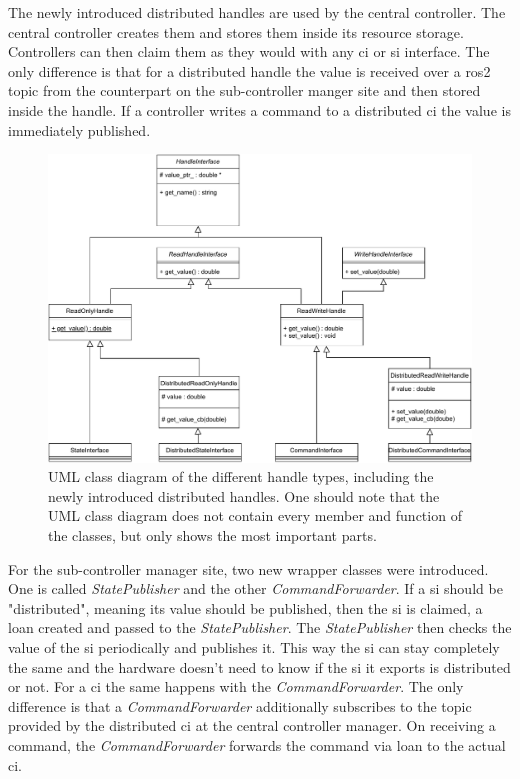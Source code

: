 The newly introduced distributed \glspl{handle} are used by the central controller. The central controller creates them and stores them inside its resource storage. Controllers can then claim them as they would with any \gls{ci} or \gls{si} interface. The only difference is that for a distributed \gls{handle} the value is received over a \gls{ros2} topic from the counterpart on the sub-controller manger site and then stored inside the \gls{handle}. If a controller writes a command to a distributed \gls{ci} the value is immediately published. \newline
\begin{figure}[htbp]
	\centering
	\includegraphics[width=1\textwidth]{Figures/c5/Handles_UML.pdf}
	\caption{UML class diagram of the different \gls{handle} types, including the newly introduced distributed \glspl{handle}. One should note that the UML class diagram does not contain every member and function of the classes, but only shows the most important parts. }
	\label{c5_fig_handle_uml}
\end{figure}
For the sub-controller manager site, two new wrapper classes were introduced. One is called \textit{StatePublisher} and the other \textit{CommandForwarder}. If a \gls{si} should be "distributed", meaning its value should be published, then the \gls{si} is claimed, a loan created and passed to the \textit{StatePublisher}. The \textit{StatePublisher} then checks the value of the \gls{si} periodically and publishes it. This way the \gls{si} can stay completely the same and the hardware doesn't need to know if the \gls{si} it exports is distributed or not. For a \gls{ci} the same happens with the \textit{CommandForwarder}. The only difference is that a \textit{CommandForwarder} additionally subscribes to the topic provided by the distributed \gls{ci} at the central controller manager.  On receiving a command, the \textit{CommandForwarder} forwards the command via loan to the actual \gls{ci}.

